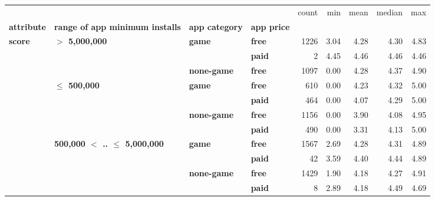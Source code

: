 \begin{tabular}{llll|rrrrr}
\toprule
      &                                 &           &      &  count &        min &       mean &     median &           max \\
\textbf{attribute} & \textbf{range of app minimum installs} & \textbf{app category} & \textbf{app price} &        &            &            &            &               \\
\midrule
\multirow{11}{*}{\textbf{score}} & \multirow{3}{*}{\textbf{$>$ 5,000,000}} & \multirow{2}{*}{\textbf{game}} & \textbf{free} &   1226 &       3.04 &       4.28 &       4.30 &          4.83 \\
      &                                 &           & \textbf{paid} &      2 &       4.45 &       4.46 &       4.46 &          4.46 \\
\cline{3-9}
      &                                 & \textbf{none-game} & \textbf{free} &   1097 &       0.00 &       4.28 &       4.37 &          4.90 \\
\cline{2-9}
      & \multirow{4}{*}{\textbf{$\leq$ 500,000}} & \multirow{2}{*}{\textbf{game}} & \textbf{free} &    610 &       0.00 &       4.23 &       4.32 &          5.00 \\
      &                                 &           & \textbf{paid} &    464 &       0.00 &       4.07 &       4.29 &          5.00 \\
\cline{3-9}
      &                                 & \multirow{2}{*}{\textbf{none-game}} & \textbf{free} &   1156 &       0.00 &       3.90 &       4.08 &          4.95 \\
      &                                 &           & \textbf{paid} &    490 &       0.00 &       3.31 &       4.13 &          5.00 \\
\cline{2-9}
\cline{3-9}
      & \multirow{4}{*}{\textbf{500,000 $<$ .. $\leq$ 5,000,000}} & \multirow{2}{*}{\textbf{game}} & \textbf{free} &   1567 &       2.69 &       4.28 &       4.31 &          4.89 \\
      &                                 &           & \textbf{paid} &     42 &       3.59 &       4.40 &       4.44 &          4.89 \\
\cline{3-9}
      &                                 & \multirow{2}{*}{\textbf{none-game}} & \textbf{free} &   1429 &       1.90 &       4.18 &       4.27 &          4.91 \\
      &                                 &           & \textbf{paid} &      8 &       2.89 &       4.18 &       4.49 &          4.69 \\

\end{tabular}
